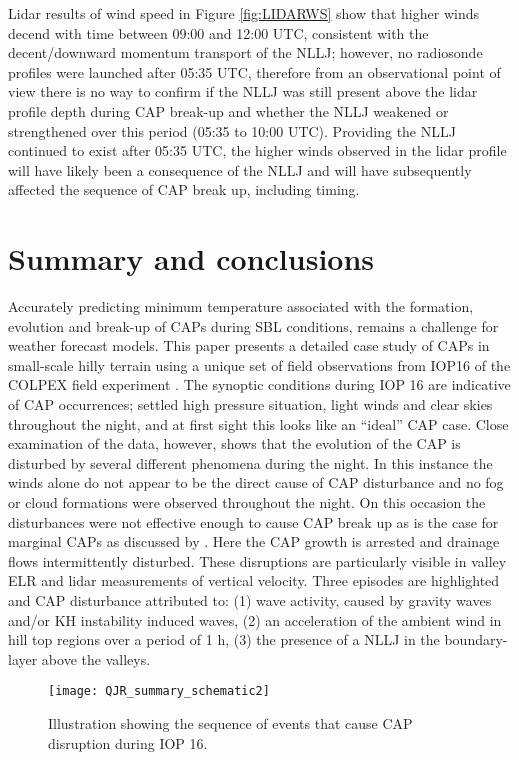 \documentclass[times]{qjrms4}
\begin{document}
Lidar results of wind speed in Figure \ref{fig:LIDARWS} show that higher winds decend with time between 09:00 and 12:00 UTC, consistent with the decent/downward momentum transport of the NLLJ; however, no radiosonde profiles were launched after 05:35 UTC, therefore from an observational point of view there is no way to confirm if the NLLJ was still present above the lidar profile depth during CAP break-up and whether the NLLJ weakened or strengthened over this period (05:35 to 10:00 UTC). Providing the NLLJ continued to exist after 05:35 UTC, the higher winds observed in the lidar profile will have likely been a consequence of the NLLJ and will have subsequently affected the sequence of CAP break up, including timing.

\section{Summary and conclusions}
\label{summary}
Accurately predicting minimum temperature associated with the formation, evolution and break-up of CAPs during SBL conditions, remains a challenge for weather forecast models. This paper presents a detailed case study of CAPs in small-scale hilly terrain using a unique set of field observations from IOP16 of the COLPEX field experiment \citep{price2010COLPEX}. The synoptic conditions during IOP 16 are indicative of CAP occurrences; settled high pressure situation, light winds and clear skies throughout the night, and at first sight this looks like an ``ideal'' CAP case. Close examination of the data, however, shows that the evolution of the CAP is disturbed by several different phenomena during the night. In this instance the winds alone do not appear to be the direct cause of CAP disturbance and no fog or cloud formations were observed throughout the night. On this occasion the disturbances were not effective enough to cause CAP break up as is the case for marginal CAPs as discussed by \citep{mahrt2015common}. Here the CAP growth is arrested and drainage flows intermittently disturbed. These disruptions are particularly visible in valley ELR and lidar measurements of vertical velocity. Three episodes are highlighted and CAP disturbance attributed to: (1) wave activity, caused by gravity waves and/or KH instability induced waves, (2) an acceleration of the ambient wind in hill top regions over a period of 1 h, (3) the presence of a NLLJ in the boundary-layer above the valleys.
       \begin{figure*}
        \centering
        \texttt{[image: QJR\_summary\_schematic2]}
        \caption{Illustration showing the sequence of events that cause CAP disruption during IOP 16.}
        \label{fig:schematic}
        \end{figure*}
\end{document}
